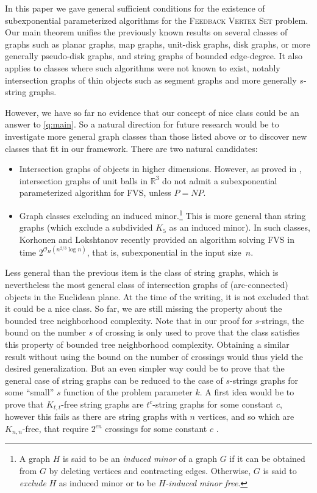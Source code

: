 \documentclass{amsart}
\newcommand{\RR}{\mathbb{R}}
\newcommand{\fvs}{\textsc{Feedback Vertex Set}\xspace}
\newcommand{\FVS}{\textsc{FVS}\xspace}
\renewcommand{\O}{\mathcal{O}}
\begin{document}
In this paper we gave general sufficient conditions for the existence of subexponential parameterized algorithms for the \fvs problem. Our main theorem unifies the previously known results on several classes of graphs such as planar graphs, map graphs, unit-disk graphs, disk graphs, or more generally pseudo-disk graphs, and string graphs of bounded edge-degree.
It also applies to classes where such algorithms were not known to exist, notably intersection graphs of thin objects such as segment graphs and more generally $s$-string graphs.

However, we have so far no evidence that our concept of nice class could be an answer to \autoref{q:main}. So a natural direction for future research would be to investigate more general graph classes than those listed above or to discover new classes that fit in our framework.
There are two natural candidates:
\begin{itemize}
    \item Intersection graphs of objects in higher dimensions.  However, as proved in \cite{fomin2018excluded}, intersection graphs of unit balls in $\RR^3$ do not admit a subexponential parameterized algorithm for \FVS, unless $P=NP$.
    \item Graph classes excluding an induced minor.\footnote{A graph $H$ is said to be an \emph{induced minor} of a graph $G$ if it can be obtained from $G$ by deleting vertices and contracting edges. Otherwise, $G$ is said to \emph{exclude} $H$ as induced minor or to be \emph{$H$-induced minor free}.} This is more general than string graphs (which exclude a subdivided $K_5$ as an induced minor). In such classes, Korhonen and Lokshtanov \cite{korhonen2023induced} recently provided an algorithm solving \FVS in time $2^{\O_H(n^{2/3}\log n)}$, that is, subexponential in the input size~$n$.
    \end{itemize}
    
    Less general than the previous item is the class of string graphs, which is nevertheless the most general class of intersection graphs of (arc-connected) objects in the Euclidean plane.  At the time of the writing, it is not excluded that it could be a nice class. So far, we are still missing the property about the bounded tree neighborhood complexity. Note that in our proof for $s$-strings, the bound on the number $s$ of crossing is only used to prove that the class satisfies this property of bounded tree neighborhood complexity. Obtaining a similar result without using the bound on the number of crossings would thus yield the desired generalization. But an even simpler way could be to prove that the general case of string graphs can be reduced to the case of $s$-strings graphs for some ``small'' $s$ function of the problem parameter $k$. A first idea would be to prove that $K_{t,t}$-free string graphs are $t^c$-string graphs for some constant $c$, however this fails as there are string graphs with $n$ vertices, and so which are $K_{n,n}$-free, that require $2^{cn}$ crossings for some constant $c$ \cite{stringexpo}.


\bigskip
 
\end{document}
